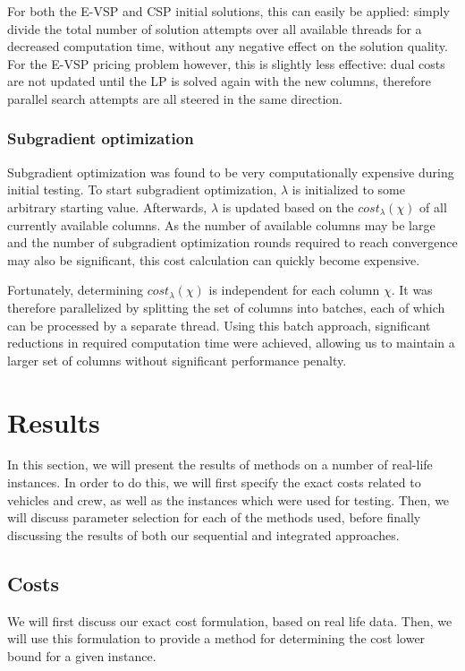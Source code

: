 \documentclass[]{article}
\begin{document}
For both the E-VSP and CSP initial solutions, this can easily be applied: simply divide the total number of solution attempts over all available threads for a decreased computation time, without any negative effect on the solution quality. For the E-VSP pricing problem however, this is slightly less effective: dual costs are not updated until the LP is solved again with the new columns, therefore parallel search attempts are all steered in the same direction.

\subsubsection{Subgradient optimization}
Subgradient optimization was found to be very computationally expensive during initial testing. To start subgradient optimization, $\lambda$ is initialized to some arbitrary starting value. Afterwards, $\lambda$ is updated based on the $cost_\lambda(\chi)$ of all currently available columns. As the number of available columns may be large and the number of subgradient optimization rounds required to reach convergence may also be significant, this cost calculation can quickly become expensive.

Fortunately, determining $cost_\lambda(\chi)$ is independent for each column $\chi$. It was therefore parallelized by splitting the set of columns into batches, each of which can be processed by a separate thread. Using this batch approach, significant reductions in required computation time were achieved, allowing us to maintain a larger set of columns without significant performance penalty.

\section{Results}
In this section, we will present the results of methods on a number of real-life instances. In order to do this, we will first specify the exact costs related to vehicles and crew, as well as the instances which were used for testing. Then, we will discuss parameter selection for each of the methods used, before finally discussing the results of both our sequential and integrated approaches.

\subsection{Costs} \label{sec:results-costs}
We will first discuss our exact cost formulation, based on real life data. Then, we will use this formulation to provide a method for determining the cost lower bound for a given instance. 
\end{document}
